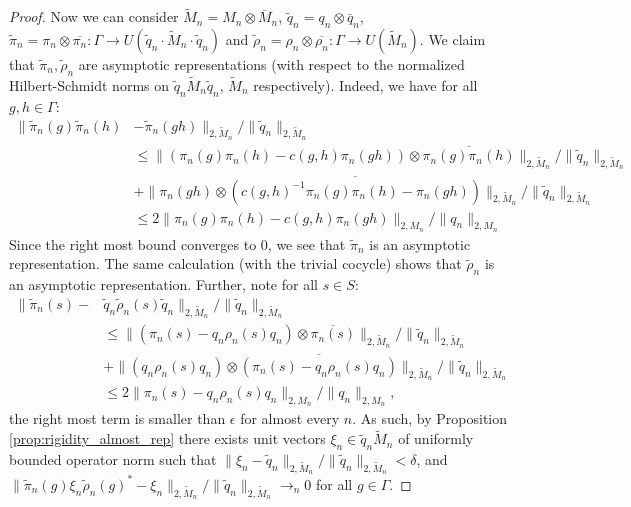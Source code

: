 \documentclass[11pt]{amsart}
\theoremstyle{definition}
\theoremstyle{remark}
\theoremstyle{definition}
\begin{document}
\begin{proof}
        Now we can consider $\widetilde{M}_n = M_n \otimes \overline{M}_n$, $\tilde q_n = q_n\otimes \bar q_n$,  $\tilde \pi_n = \pi_n\otimes \overline{\pi_n}: \Gamma \to U(\tilde q_n \cdot \widetilde M_{n} \cdot \tilde q_n)$ and $\tilde \rho_n = \rho_n \otimes \overline{\rho_n}: \Gamma \to U(\widetilde M_{n})$. We claim that $\tilde \pi_n, \tilde \rho_n$ are asymptotic representations (with respect to the normalized Hilbert-Schmidt norms on $\tilde q_n \widetilde M_n \tilde q_n$, $\widetilde M_n$ respectively).
        Indeed, we have for all $g,h \in \Gamma$:
        \begin{align*}
             \| \tilde\pi_n(g)\tilde \pi_n(h) &-  \tilde\pi_n(gh)\|_{2, \widetilde{M}_n} / \| \tilde q_n \|_{2,\widetilde{M}_n} \\
             &\leq   \|(\pi_n(g) \pi_n(h) - c(g,h)\pi_n(gh))\otimes \overline{\pi_n(g) \pi_n(h)} \|_{2,\widetilde{M}_n} / \| \tilde q_n \|_{2,\widetilde{M}_n}\\
             &+   \| \pi_n(gh)\otimes \overline{(c(g,h)^{-1}\pi_n(g) \pi_n(h) - \pi_n(gh))} \|_{2,\widetilde{M}_n} / \| \tilde q_n \|_{2,\widetilde{M}_n}\\
             &\leq 2\|\pi_n(g) \pi_n(h) - c(g,h)\pi_n(gh) \|_{2, M_n} / \| q_n \|_{2,M_n}
        \end{align*}
        Since the right most bound converges to $0$, we see that $\tilde \pi_n$ is an asymptotic representation. The same calculation (with the trivial cocycle) shows that $\tilde \rho_n$ is an asymptotic representation.
        Further, note for all $s \in S$:
        \begin{align*}
            \| \tilde \pi_n(s) -& \tilde q_n \tilde \rho_n(s) \tilde q_n\|_{2, \widetilde M_n} / \| \tilde q_n \|_{2,\widetilde M_n} \\
            &\leq \| (\pi_n(s) - q_n \rho_n(s) q_n) \otimes \overline{\pi_n(s)} \|_{2,\widetilde{M}_n} / \| \tilde q_n\|_{2, \widetilde{M}_n} \\
            &+ \| (q_n \rho_n(s) q_n) \otimes \overline{(\pi_n(s) -q_n \rho_n(s) q_n)} \|_{2,\widetilde{M}_n} / \| \tilde q_n\|_{2, \widetilde{M}_n} \\
            &\leq2\| \pi_n(s) - q_n\rho_n(s) q_n\|_{2,M_n} / \|q_n \|_{2,M_n},
        \end{align*}
        the right most term is smaller than $\epsilon$ for almost every $n$. As such, by Proposition \ref{prop:rigidity_almost_rep}  there exists unit vectors $\xi_n \in \tilde q_n \widetilde{M}_n$ of uniformly bounded operator norm such that $\| \xi_n - \tilde q_n \|_{2, \widetilde{M}_n} / \| \tilde q_n\|_{2, \widetilde{M}_n} < \delta$, and$\|\tilde \pi_n(g)\xi_n \tilde \rho_n(g)^* - \xi_n \|_{2,\widetilde M_n} / \| \tilde q_n \|_{2,\widetilde M_n} \to_{n} 0$ for all $g \in \Gamma$.

\end{proof}
\end{document}
